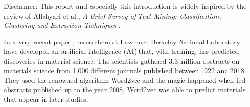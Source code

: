 
Disclaimer: This report and especially this introduction is widely inspired by the review of Allahyari et al., \textit{A Brief Survey of Text Mining: Classification, Clustering and Extraction Techniques} \cite{Allahyari2017}.
\newline

In a very recent paper \cite{Tshitoyan2019}, researchers at Lawrence Berkeley National Laboratory have developed an artificial intelligence (AI) that, with training, has predicted discoveries in material science.
The scientists gathered 3.3 million abstracts on materials science from 1,000 different journals published between 1922 and 2018. 
They used the renowned algorithm Word2vec and the magic happened when fed abstracts published up to the year 2008, Word2vec was able to predict materials that appear in later studies.
\newline




